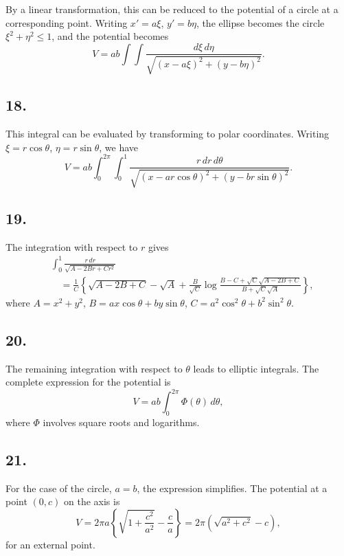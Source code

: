 \documentclass[11pt,a4paper]{article}
\begin{document}
By a linear transformation, this can be reduced to the potential of a circle
at a corresponding point. Writing $x'=a\xi$, $y'=b\eta$, the ellipse
becomes the circle $\xi^2+\eta^2\leq 1$, and the potential becomes
\[
V = ab\int\!\!\!\int \frac{d\xi\,d\eta}
                         {\sqrt{(x-a\xi)^2+(y-b\eta)^2}}.
\]

\subsection*{18.}

This integral can be evaluated by transforming to polar coordinates. Writing
$\xi=r\cos\theta$, $\eta=r\sin\theta$, we have
\[
V = ab\int_0^{2\pi}\int_0^1
    \frac{r\,dr\,d\theta}
         {\sqrt{(x-ar\cos\theta)^2+(y-br\sin\theta)^2}}.
\]

\subsection*{19.}

The integration with respect to $r$ gives
\begin{align*}
&\int_0^1 \frac{r\,dr}{\sqrt{A-2Br+Cr^2}} \\
&\quad = \frac{1}{C}\left\{
      \sqrt{A-2B+C} - \sqrt{A}
      + \frac{B}{\sqrt{C}}
        \log\frac{B-C+\sqrt{C}\sqrt{A-2B+C}}
                    {B+\sqrt{C}\sqrt{A}}
    \right\},
\end{align*}
where $A=x^2+y^2$, $B=ax\cos\theta+by\sin\theta$,
$C=a^2\cos^2\theta+b^2\sin^2\theta$.

\newpage
\subsection*{20.}

The remaining integration with respect to $\theta$ leads to elliptic
integrals. The complete expression for the potential is
\[
V = ab\int_0^{2\pi} \Phi(\theta)\,d\theta,
\]
where $\Phi$ involves square roots and logarithms.

\subsection*{21.}

For the case of the circle, $a=b$, the expression simplifies. The potential
at a point $(0,c)$ on the axis is
\[
V = 2\pi a\left\{\sqrt{1+\frac{c^2}{a^2}} - \frac{c}{a}\right\}
  = 2\pi\left(\sqrt{a^2+c^2}-c\right),
\]
for an external point.
\end{document}
